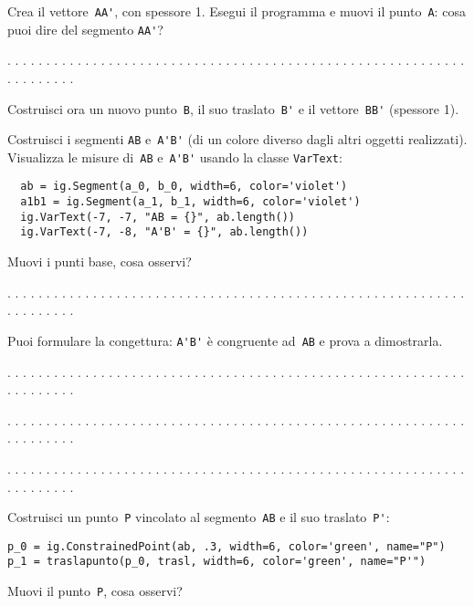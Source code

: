 Crea il vettore~\lstinline{AA'}, con spessore 1.
Esegui il programma e muovi il punto~\lstinline{A}: cosa puoi dire del segmento
\lstinline{AA'}?

. . . . . . . . . . . . . . . . . . . . . . . . . . . . . . . . . . . . . . . .
. . . . . . . . . . . . . . . . . . . . . . . . . . . .

Costruisci ora un nuovo punto~\lstinline{B}, il suo traslato~\lstinline{B'} e
il vettore~\lstinline{BB'} (spessore 1).

Costruisci i segmenti \lstinline{AB} e~\lstinline{A'B'}
(di un colore diverso dagli altri oggetti realizzati).
Visualizza le misure di~\lstinline{AB} e~\lstinline{A'B'} usando la classe 
\lstinline{VarText}:

\begin{lstlisting}
  ab = ig.Segment(a_0, b_0, width=6, color='violet')
  a1b1 = ig.Segment(a_1, b_1, width=6, color='violet')
  ig.VarText(-7, -7, "AB = {}", ab.length())
  ig.VarText(-7, -8, "A'B' = {}", ab.length())
\end{lstlisting}

Muovi i punti base, cosa osservi?

. . . . . . . . . . . . . . . . . . . . . . . . . . . . . . . . . . . . . . . .
. . . . . . . . . . . . . . . . . . . . . . . . . . . .

Puoi formulare la congettura: \lstinline{A'B'} è congruente ad~\lstinline{AB} e
prova a dimostrarla.

. . . . . . . . . . . . . . . . . . . . . . . . . . . . . . . . . . . . . . . .
. . . . . . . . . . . . . . . . . . . . . . . . . . . .

. . . . . . . . . . . . . . . . . . . . . . . . . . . . . . . . . . . . . . . .
. . . . . . . . . . . . . . . . . . . . . . . . . . . .

. . . . . . . . . . . . . . . . . . . . . . . . . . . . . . . . . . . . . . . .
. . . . . . . . . . . . . . . . . . . . . . . . . . . .

Costruisci un punto~\lstinline{P} vincolato al segmento~\lstinline{AB} e il suo
traslato~\lstinline{P'}:

\begin{lstlisting}
p_0 = ig.ConstrainedPoint(ab, .3, width=6, color='green', name="P")
p_1 = traslapunto(p_0, trasl, width=6, color='green', name="P'")
\end{lstlisting}

Muovi il punto~\lstinline{P}, cosa osservi?


